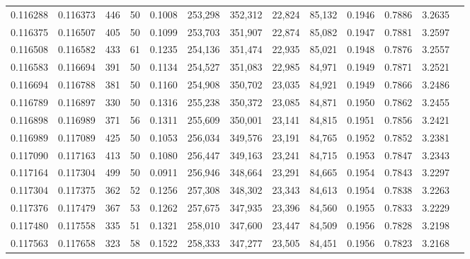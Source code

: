 \begin{tabular}{rrrrrrrrrrrrr}
0.116288 & 0.116373 &   446 &  50 &                                     0.1008 & 253,298 & 352,312 &  22,824 &  85,132 & 0.1946 & 0.7886 & 3.2635 \\
0.116375 & 0.116507 &   405 &  50 &                                     0.1099 & 253,703 & 351,907 &  22,874 &  85,082 & 0.1947 & 0.7881 & 3.2597 \\
0.116508 & 0.116582 &   433 &  61 &                                     0.1235 & 254,136 & 351,474 &  22,935 &  85,021 & 0.1948 & 0.7876 & 3.2557 \\
0.116583 & 0.116694 &   391 &  50 &                                     0.1134 & 254,527 & 351,083 &  22,985 &  84,971 & 0.1949 & 0.7871 & 3.2521 \\
0.116694 & 0.116788 &   381 &  50 &                                     0.1160 & 254,908 & 350,702 &  23,035 &  84,921 & 0.1949 & 0.7866 & 3.2486 \\
0.116789 & 0.116897 &   330 &  50 &                                     0.1316 & 255,238 & 350,372 &  23,085 &  84,871 & 0.1950 & 0.7862 & 3.2455 \\
0.116898 & 0.116989 &   371 &  56 &                                     0.1311 & 255,609 & 350,001 &  23,141 &  84,815 & 0.1951 & 0.7856 & 3.2421 \\
0.116989 & 0.117089 &   425 &  50 &                                     0.1053 & 256,034 & 349,576 &  23,191 &  84,765 & 0.1952 & 0.7852 & 3.2381 \\
0.117090 & 0.117163 &   413 &  50 &                                     0.1080 & 256,447 & 349,163 &  23,241 &  84,715 & 0.1953 & 0.7847 & 3.2343 \\
0.117164 & 0.117304 &   499 &  50 &                                     0.0911 & 256,946 & 348,664 &  23,291 &  84,665 & 0.1954 & 0.7843 & 3.2297 \\
0.117304 & 0.117375 &   362 &  52 &                                     0.1256 & 257,308 & 348,302 &  23,343 &  84,613 & 0.1954 & 0.7838 & 3.2263 \\
0.117376 & 0.117479 &   367 &  53 &                                     0.1262 & 257,675 & 347,935 &  23,396 &  84,560 & 0.1955 & 0.7833 & 3.2229 \\
0.117480 & 0.117558 &   335 &  51 &                                     0.1321 & 258,010 & 347,600 &  23,447 &  84,509 & 0.1956 & 0.7828 & 3.2198 \\
0.117563 & 0.117658 &   323 &  58 &                                     0.1522 & 258,333 & 347,277 &  23,505 &  84,451 & 0.1956 & 0.7823 & 3.2168 \\

\end{tabular}
